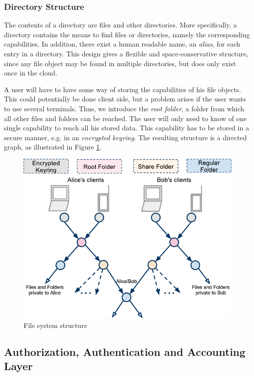\documentclass[pdftex,english,10pt,b5paper,twoside]{book}
\begin{document}
\subsubsection{Directory Structure}

The contents of a directory are files and other directories. More specifically,
a directory contains the means to find files or directories, namely the
corresponding capabilities. In addition, there exist a human readable name, an
\emph{alias}, for each entry in a directory. This design gives a flexible and
space-conservative structure, since any file object may be found in multiple
directories, but does only exist once in the cloud.

A user will have to have some way of storing the capabilities of his file
objects. This could potentially be done client side, but a problem arises if
the user wants to use several terminals. Thus, we introduce the \emph{root
folder}, a folder from which all other files and folders can be reached. The
user will only need to know of one single capability to reach all his stored
data. This capability has to be stored in a secure manner, e.g. in an
\emph{encrypted keyring}. The resulting structure is a directed graph, as
illustrated in Figure \ref{fig:AS:filesystem}.

\begin{figure}[h!]
    \centering
    \includegraphics[width=\columnwidth]{ArchitectureFileSystem.pdf}
    \caption{File system structure}
    \label{fig:AS:filesystem}
\end{figure}

\subsection{Authorization, Authentication and Accounting Layer}
\end{document}
